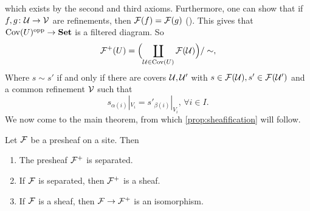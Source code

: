 \documentclass{article}
\DeclareMathOperator{\opp}{opp}
\DeclareMathOperator{\Cov}{Cov}
\begin{document}
which exists by the second and third axioms.
Furthermore, one can show that if $f,g\colon \mathcal{U} \to \mathcal{V}$
are refinements, then $\mathcal{F}(f) = \mathcal{F}(g)$
(\cite[\href{https://stacks.math.columbia.edu/tag/00W7}{Tag 00W7}]{stacks-project}).
This gives that $\Cov(U)^{\opp} \to \Set$ is a filtered
diagram. So
\begin{equation*}
    \mcF^+(U) =\Bigl( \coprod\limits_{\mcU \in \Cov(U)} \mcF(\mcU)\Bigr)/ \sim,
\end{equation*}
Where $s \sim s'$ if and only if there are covers $\mathcal{U}, \mathcal{U}'$ with
$s\in \mathcal{F}(\mathcal{U}), s' \in \mathcal{F}(\mathcal{U}')$ and a common refinement $\mathcal{V}$ such that
\begin{equation*}
    s_{\alpha(i)}|_{V_i} = s'_{\beta(i)}|_{V_i}, \, \forall i\in I.
\end{equation*}
We now come to the main theorem, from which
\cref{prop:sheafification} will follow.
\begin{theorem}
    Let $\mathcal{F}$ be a presheaf on a site. Then
    \begin{enumerate}
        \item The presheaf $\mathcal{F}^+$ is separated.
        \item If $\mathcal{F}$ is separated, then $\mathcal{F}^+$ is a sheaf.
        \item If $\mathcal{F}$ is a sheaf, then $\mathcal{F} \to \mathcal{F}^+$ is an isomorphism.
    \end{enumerate}
\end{theorem}
\end{document}
